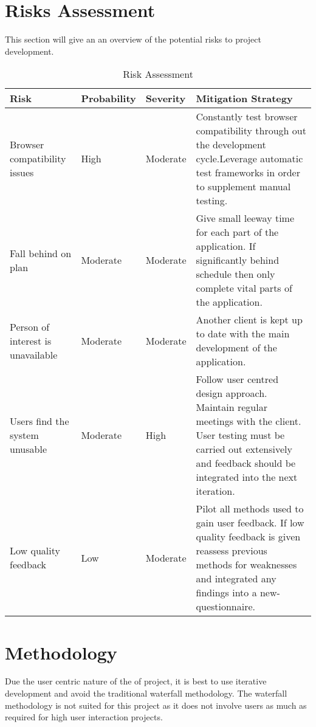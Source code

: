\documentclass[a4paper,oneside,11pt]{report}
\begin{document}
\chapter{Risks Assessment}
 	This section will give an an overview of the potential risks to project development.
\begin{center}
	\begin{table}[!ht]
    \begin{tabular}[ht]{| l | l | l | p{5cm} |}
    \hline
    Risk & Probability & Severity & Mitigation Strategy \\ 
    \hline
    Browser compatibility issues & High & Moderate & Constantly test browser compatibility through out the development cycle.Leverage automatic test frameworks in order to supplement manual testing.\\ \hline
    Fall behind on plan & Moderate & Moderate & Give small leeway time for each part of the application. If significantly behind schedule then only complete vital parts of the application.  \\ \hline
    Person of interest is unavailable & Moderate & Moderate &  Another client is kept up to date with the main development of the application.\\ 
    \hline
Users find the system unusable & Moderate & High & Follow user centred design approach. Maintain regular meetings with the client. User testing must be carried out extensively and feedback should be integrated into the next iteration. \\ 
    \hline
    Low quality feedback & Low & Moderate & Pilot all methods used to gain user feedback. If low quality feedback is given reassess previous methods for weaknesses and integrated any findings into a new- questionnaire. \\ 
    \hline
    
    \end{tabular}
    \caption{Risk Assessment}
\label{tab:xyz}
    \end{table}
    \end{center}
\chapter{Methodology}
Due the user centric nature of the of project, it is best to use iterative development and avoid the traditional waterfall methodology. The waterfall methodology is not suited for this project as it does not involve users as much as required for high user interaction projects. 
\end{document}
